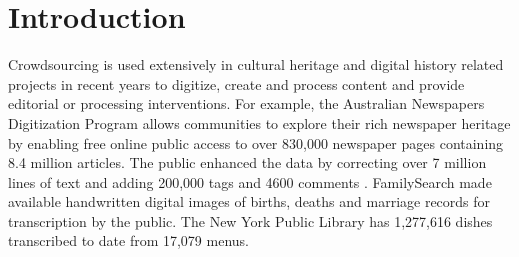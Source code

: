 \documentclass{sig-alternate}
\begin{document}
\section{Introduction}
%
%
\label{sec:intro}

Crowdsourcing is used extensively in cultural heritage and digital history related projects in recent years to digitize, create and process content and provide editorial or processing interventions. For example, the Australian Newspapers Digitization Program \cite{ADNP} allows communities to explore their rich newspaper heritage by enabling free online public access to over 830,000 newspaper pages containing 8.4 million articles. The public enhanced the data by correcting over 7 million lines of text and adding 200,000 tags and 4600 comments \cite{holley_09}. 
FamilySearch \cite{famSearch} made available handwritten digital images of births, deaths and marriage records for transcription by the public. The New York Public Library has 1,277,616 dishes transcribed to date from 17,079 menus. 
\end{document}
